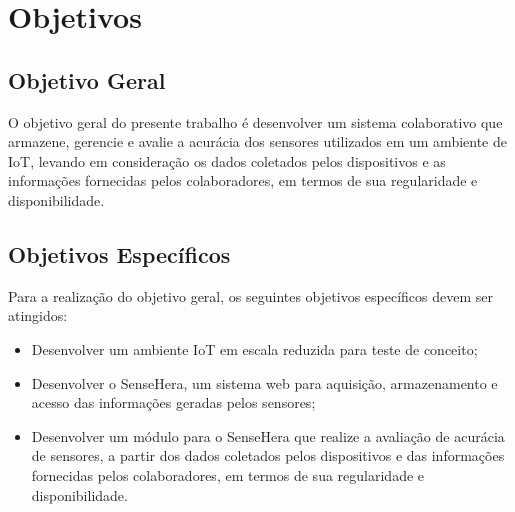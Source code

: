 \section{Objetivos}
\label{sec:objetivo}
\subsection{Objetivo Geral}
\null \quad O objetivo geral do presente trabalho é desenvolver um sistema colaborativo que armazene, gerencie e avalie a acurácia dos sensores utilizados em um ambiente de \acrlong{IoT}, levando em consideração os dados coletados pelos dispositivos e as informações fornecidas pelos colaboradores, em termos de sua regularidade e disponibilidade.
\subsection{Objetivos Específicos}
\null \quad Para a realização do objetivo geral, os seguintes objetivos específicos devem ser atingidos:
\begin{itemize}
  \item Desenvolver um ambiente \acrshort{IoT} em escala reduzida para teste de conceito;
  \item Desenvolver o SenseHera, um sistema web para aquisição, armazenamento e acesso das informações geradas pelos sensores;
  \item Desenvolver um módulo para o SenseHera que realize a avaliação de acurácia de sensores, a partir dos dados coletados pelos dispositivos e das informações fornecidas pelos colaboradores, em termos de sua regularidade e disponibilidade.
\end{itemize}
